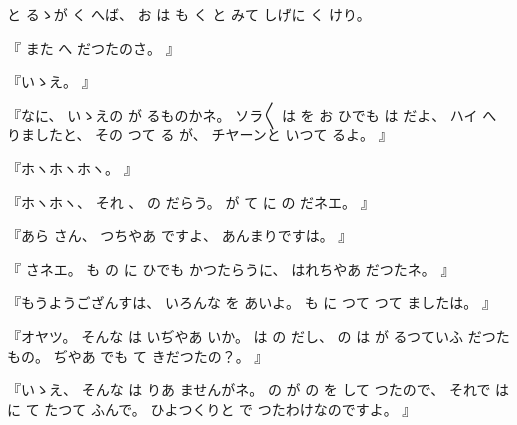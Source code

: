 %
と
るゝが
く
へば、
%
お
は
も
く
と
みて
しげに
く
けり。

%
『
また
へ
だつたのさ。
』

%
『いゝえ。
』

%
『なに、
%
いゝえの
が
るものかネ。
%
ソラ〳〵
は
を
お
ひでも
は
だよ、
%
ハイ
へ%
りましたと、
%
その
つて
る
が、
%
チヤーンと
いつて
るよ。
』

%
『ホヽホヽホヽ。
』

%
『ホヽホヽ、
%
それ
、
%
の
だらう。
%
が
て
に
の
だネエ。
』

%
『あら
さん、
%
つちやあ
ですよ、
%
あんまりですは。
』

%
『
さネエ。
%
も
の
に
ひでも
かつたらうに、
%
はれちやあ
だつたネ。%
』

%
『もうようござんすは、
%
いろんな
を
あいよ。
%
も
に
つて
つて
ましたは。
』

%
『オヤツ。
%
そんな
は
いぢやあ
いか。
%
は
の
だし、
%
の
は
が
るつていふ
だつたもの。
%
ぢやあ
でも
て
きだつたの？。
』

%
『いゝえ、
%
そんな
は
りあ
ませんがネ。
%
の
が
の
を
して
つたので、
%
それで
は
に
て
たつて
ふんで。
%
ひよつくりと
で
つたわけなのですよ。
』

